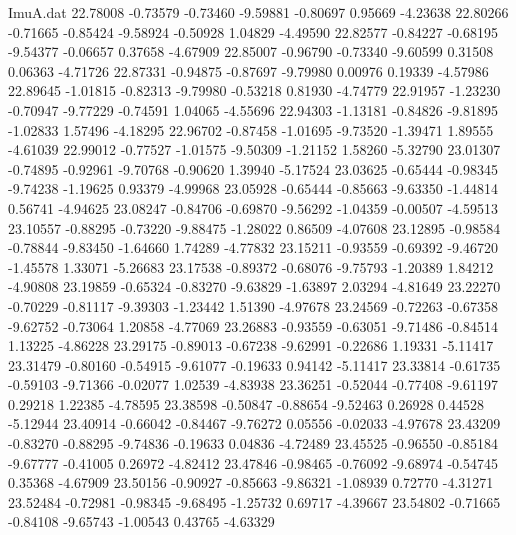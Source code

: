 \begin{filecontents}{ImuA.dat}
  22.78008   -0.73579   -0.73460   -9.59881   -0.80697    0.95669   -4.23638
  22.80266   -0.71665   -0.85424   -9.58924   -0.50928    1.04829   -4.49590
  22.82577   -0.84227   -0.68195   -9.54377   -0.06657    0.37658   -4.67909
  22.85007   -0.96790   -0.73340   -9.60599    0.31508    0.06363   -4.71726
  22.87331   -0.94875   -0.87697   -9.79980    0.00976    0.19339   -4.57986
  22.89645   -1.01815   -0.82313   -9.79980   -0.53218    0.81930   -4.74779
  22.91957   -1.23230   -0.70947   -9.77229   -0.74591    1.04065   -4.55696
  22.94303   -1.13181   -0.84826   -9.81895   -1.02833    1.57496   -4.18295
  22.96702   -0.87458   -1.01695   -9.73520   -1.39471    1.89555   -4.61039
  22.99012   -0.77527   -1.01575   -9.50309   -1.21152    1.58260   -5.32790
  23.01307   -0.74895   -0.92961   -9.70768   -0.90620    1.39940   -5.17524
  23.03625   -0.65444   -0.98345   -9.74238   -1.19625    0.93379   -4.99968
  23.05928   -0.65444   -0.85663   -9.63350   -1.44814    0.56741   -4.94625
  23.08247   -0.84706   -0.69870   -9.56292   -1.04359   -0.00507   -4.59513
  23.10557   -0.88295   -0.73220   -9.88475   -1.28022    0.86509   -4.07608
  23.12895   -0.98584   -0.78844   -9.83450   -1.64660    1.74289   -4.77832
  23.15211   -0.93559   -0.69392   -9.46720   -1.45578    1.33071   -5.26683
  23.17538   -0.89372   -0.68076   -9.75793   -1.20389    1.84212   -4.90808
  23.19859   -0.65324   -0.83270   -9.63829   -1.63897    2.03294   -4.81649
  23.22270   -0.70229   -0.81117   -9.39303   -1.23442    1.51390   -4.97678
  23.24569   -0.72263   -0.67358   -9.62752   -0.73064    1.20858   -4.77069
  23.26883   -0.93559   -0.63051   -9.71486   -0.84514    1.13225   -4.86228
  23.29175   -0.89013   -0.67238   -9.62991   -0.22686    1.19331   -5.11417
  23.31479   -0.80160   -0.54915   -9.61077   -0.19633    0.94142   -5.11417
  23.33814   -0.61735   -0.59103   -9.71366   -0.02077    1.02539   -4.83938
  23.36251   -0.52044   -0.77408   -9.61197    0.29218    1.22385   -4.78595
  23.38598   -0.50847   -0.88654   -9.52463    0.26928    0.44528   -5.12944
  23.40914   -0.66042   -0.84467   -9.76272    0.05556   -0.02033   -4.97678
  23.43209   -0.83270   -0.88295   -9.74836   -0.19633    0.04836   -4.72489
  23.45525   -0.96550   -0.85184   -9.67777   -0.41005    0.26972   -4.82412
  23.47846   -0.98465   -0.76092   -9.68974   -0.54745    0.35368   -4.67909
  23.50156   -0.90927   -0.85663   -9.86321   -1.08939    0.72770   -4.31271
  23.52484   -0.72981   -0.98345   -9.68495   -1.25732    0.69717   -4.39667
  23.54802   -0.71665   -0.84108   -9.65743   -1.00543    0.43765   -4.63329

\end{filecontents}
